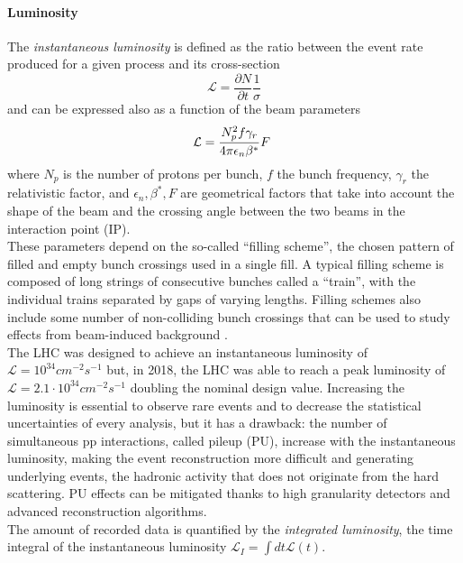 \paragraph*{Luminosity}
The \emph{instantaneous luminosity} is defined as the ratio between the event rate produced for a given process and its cross-section
\begin{equation}
    \mathcal{L} = \frac{\partial N}{\partial t} \frac{1}{\sigma} 
\end{equation}
and can be expressed also as a function of the beam parameters
\begin{equation}
    \mathcal{L}=\frac{N_{p}^{2}f\gamma_{r}}{4\pi\epsilon_{n}\beta\sp{\ast}}F\ 
\end{equation}
where $N_p$ is the number of protons per bunch, $f$ the bunch frequency, $\gamma_r$ the relativistic factor, and $\epsilon_n, \beta^*, F$ are geometrical factors that take into account the shape of the beam and the crossing angle between the two beams in the interaction point (IP).\\
These parameters depend on the so-called “filling scheme”, the chosen pattern of filled and empty bunch crossings used in a single fill.
A typical filling scheme is composed of long strings of consecutive bunches called a “train”, with the individual trains separated by gaps of varying lengths. Filling schemes also include some number of non-colliding bunch crossings that can be used to study effects from beam-induced background \cite{CMSCollaboration2021PrecisionCMS}.\\
The LHC was designed to achieve an instantaneous luminosity of $\mathcal{L}=10^{34} cm^{-2}s^{-1}$ but, in 2018, the LHC was able to reach a peak luminosity of $\mathcal{L}=2.1 \cdot 10^{34} cm^{-2}s^{-1}$ doubling the nominal design value. Increasing the luminosity is essential to observe rare events and to decrease the statistical uncertainties of every analysis, but it has a drawback: the number of simultaneous pp interactions, called pileup (PU), increase with the instantaneous luminosity, making the event reconstruction more difficult and generating underlying events, \ie the hadronic activity that does not originate from the hard scattering. PU effects can be mitigated thanks to high granularity detectors and advanced reconstruction algorithms.\\
The amount of recorded data is quantified by the \emph{integrated luminosity}, the time integral of the instantaneous luminosity $\mathcal{L}_I=\int dt \mathcal{L}(t)$.


